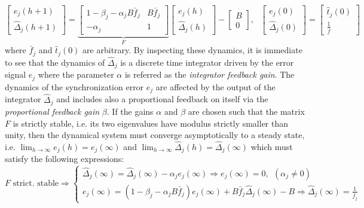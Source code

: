 \documentclass[english,a4paper,10pt,final]{article}
\numberwithin{equation}{section}
\numberwithin{figure}{section}
\begin{document}
\begin{equation}\label{eqn:state_space}
\left[ \begin{array}{c} e_j(h+1) \\ \hat \Delta_j(h+1) \end{array} \right] =\underbrace{\left[ \begin{array}{cc} 1-\beta_j -\alpha_j B \bar f_j& B \bar f_j\\ -\alpha_j & 1\end{array} \right]}_{F} \left[ \begin{array}{c} e_j(h) \\ \hat \Delta_j(h) \end{array} \right]-\left[ \begin{array}{c}  B \\ 0 \end{array} \right] , \ \ \ \left[ \begin{array}{c} e_j(0) \\ \hat \Delta_j(0) \end{array} \right] =\left[ \begin{array}{c} \hat t_j(0) \\  \frac{1}{\hat f} \end{array} \right]   
\end{equation}
where $\bar{f}_j$ and $\hat t_j(0)$ are arbitrary. By inspecting these dynamics, it is immediate to see that the dynamics of $\hat \Delta_j$ is a discrete time integrator driven by the error signal $e_j$ where the parameter $\alpha$ is referred as the \emph{integrator feedback gain}. The dynamics of the synchronization error $e_j$ are affected by the output of the integrator $\hat \Delta_j$ and includes also a proportional feedback on itself via the \emph{proportional feedback gain} $\beta$. If the gains $\alpha$ and $\beta$ are chosen such that the matrix $F$ is strictly stable, i.e. its two eigenvalues have modulus strictly smaller than unity, then the dynamical system must converge asymptotically to a steady state, i.e. $\lim_{h\to \infty}e_j(h)=e_j(\infty)$ and $\lim_{h\to \infty}\hat \Delta_j(h)=\hat \Delta_j(\infty)$ which must satisfy the following expressions:
$$F \mbox{ strict. stable} \Longrightarrow \left\{\begin{array}{l} \hat{\Delta}_j(\infty)=  \hat{\Delta}_j(\infty) -\alpha_j e_j(\infty) \Longrightarrow e_j(\infty)=0, \ \ (\alpha_j\neq 0)\\
e_j(\infty) = (1-\beta_j -\alpha_j B \bar f_j) e_j(\infty) +B \bar f_j \hat{\Delta}_j(\infty) - B \Longrightarrow \hat{\Delta}_j(\infty) =\frac{1}{\bar f_j}\end{array}\right.$$
\end{document}
